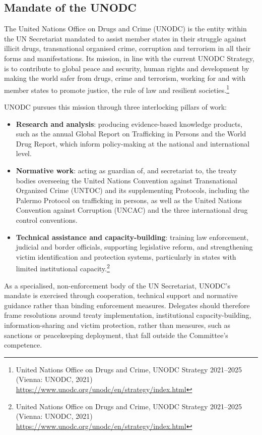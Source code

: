 \subsection{Mandate of the UNODC}

The United Nations Office on Drugs and Crime (UNODC) is the entity within the UN Secretariat mandated to assist member states in their struggle against illicit drugs, transnational organised crime, corruption and terrorism in all their forms and manifestations. Its mission, in line with the current UNODC Strategy, is to contribute to global peace and security, human rights and development by making the world safer from drugs, crime and terrorism, working for and with member states to promote justice, the rule of law and resilient societies.\footnote{United Nations Office on Drugs and Crime, UNODC Strategy 2021–2025 (Vienna: UNODC, 2021) \url{https://www.unodc.org/unodc/en/strategy/index.html}}

UNODC pursues this mission through three interlocking pillars of work:

\begin{itemize}
  \item \textbf{Research and analysis}: producing evidence-based knowledge products, such as the annual Global Report on Trafficking in Persons and the World Drug Report, which inform policy-making at the national and international level.
  \item \textbf{Normative work}: acting as guardian of, and secretariat to, the treaty bodies overseeing the United Nations Convention against Transnational Organized Crime (UNTOC) and its supplementing Protocols, including the Palermo Protocol on trafficking in persons, as well as the United Nations Convention against Corruption (UNCAC) and the three international drug control conventions.
  \item \textbf{Technical assistance and capacity-building}: training law enforcement, judicial and border officials, supporting legislative reform, and strengthening victim identification and protection systems, particularly in states with limited institutional capacity.\footnote{United Nations Office on Drugs and Crime, UNODC Strategy 2021–2025 (Vienna: UNODC, 2021) \url{https://www.unodc.org/unodc/en/strategy/index.html}}
\end{itemize}

As a specialised, non-enforcement body of the UN Secretariat, UNODC's mandate is exercised through cooperation, technical support and normative guidance rather than binding enforcement measures. Delegates should therefore frame resolutions around treaty implementation, institutional capacity-building, information-sharing and victim protection, rather than measures, such as sanctions or peacekeeping deployment, that fall outside the Committee's competence.


